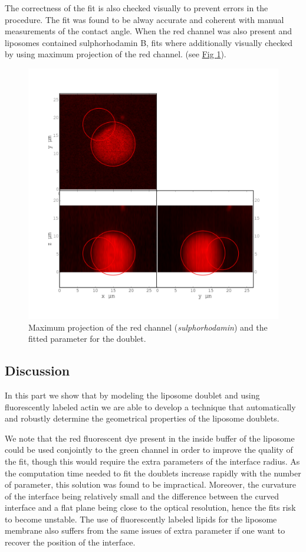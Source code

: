 \documentclass[A4paperpaper,11pt,english]{sphinxmanual}
\begin{document}
The correctness of the fit is also checked visually to prevent errors in the
procedure.  The fit was found to be alway accurate and coherent with manual
measurements of the contact angle.  When the red channel was also present and liposomes
contained sulphorhodamin B, fits where additionally visually checked by using maximum
projection of the red channel.  (see \hyperref[index-latex:srhod]{Fig  \ref*{index-latex:srhod}}).
\begin{figure}[htbp]
\centering
\capstart

\includegraphics[width=0.800\linewidth]{srhod_superimpose.png}
\caption{Maximum projection of the red channel (\emph{sulphorhodamin}) and the fitted
parameter for the doublet.}\label{index-latex:srhod}\end{figure}


\subsection{Discussion}
\label{index-latex:id24}
In this part we show that by modeling the liposome doublet and using
fluorescently labeled actin we are able to develop a technique that
automatically and robustly determine the geometrical properties of the liposome
doublets.

We note that the red fluorescent dye present in the inside buffer of the
liposome could be used conjointly to the green channel in order to improve the
quality of the fit, though this would require the extra parameters of the
interface radius. As the computation time needed to fit the doublets increase
rapidly with the number of parameter, this solution was found to be
impractical.  Moreover, the curvature of the interface being relatively small
and the difference between the curved interface and a flat plane being close to
the optical resolution, hence the fits risk to become unstable.  The use of
fluorescently labeled lipids for the liposome membrane also suffers from the
same issues of extra parameter if one want to recover the position of the
interface.
\end{document}
